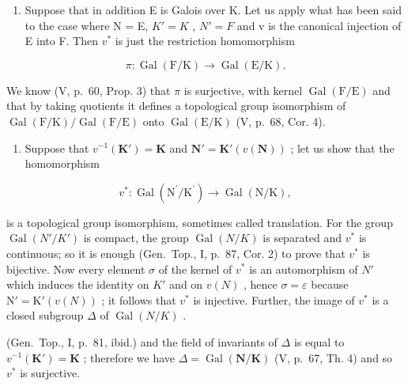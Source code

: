 \begin{enumerate}
\def\labelenumi{\alph{enumi})}
\setcounter{enumi}{1}
\tightlist
\item
  Suppose that in addition E is Galois over K. Let us apply what has been said to the case where N = E, \(K' = K\) , \(N' = F\) and v is the canonical injection of E into F. Then \(v^{*}\) is just the restriction homomorphism
\end{enumerate}

\[
\pi : \operatorname{Gal} (\mathrm{F} / \mathrm{K}) \rightarrow \operatorname{Gal} (\mathrm{E} / \mathrm{K}).
\]

We know (V, p.~60, Prop. 3) that \(\pi\) is surjective, with kernel \(\operatorname{Gal}(\mathrm{F} / \mathrm{E})\) and that by taking quotients it defines a topological group isomorphism of \(\operatorname{Gal}(\mathrm{F} / \mathrm{K}) / \operatorname{Gal}(\mathrm{F} / \mathrm{E})\) onto \(\operatorname{Gal}(\mathrm{E} / \mathrm{K})\) (V, p.~68, Cor. 4).

\begin{enumerate}
\def\labelenumi{\alph{enumi})}
\setcounter{enumi}{2}
\tightlist
\item
  Suppose that \(v^{-1}(\mathbf{K}') = \mathbf{K}\) and \(\mathbf{N}' = \mathbf{K}'(v(\mathbf{N}))\) ; let us show that the homomorphism
\end{enumerate}

\[
v ^ {*}: \operatorname{Gal} \left(\mathrm{N} ^ {\prime} / \mathrm{K} ^ {\prime}\right)\rightarrow \operatorname{Gal} (\mathrm{N} / \mathrm{K}),
\]

is a topological group isomorphism, sometimes called translation. For the group \(\operatorname{Gal}(N'/K')\) is compact, the group \(\operatorname{Gal}(N/K)\) is separated and \(v^{*}\) is continuous; so it is enough (Gen.~Top., I, p.~87, Cor. 2) to prove that \(v^{*}\) is bijective. Now every element \(\sigma\) of the kernel of \(v^{*}\) is an automorphism of \(N'\) which induces the identity on \(K'\) and on \(v(N)\) , hence \(\sigma = \varepsilon\) because \(\mathrm{N}' = \mathrm{K}'(v(N))\) ; it follows that \(v^{*}\) is injective. Further, the image of \(v^{*}\) is a closed subgroup \(\Delta\) of \(\operatorname{Gal}(N/K)\) .

(Gen.~Top., I, p.~81, ibid.) and the field of invariants of \(\Delta\) is equal to \(v^{-1}(\mathbf{K}') = \mathbf{K}\) ; therefore we have \(\Delta = \operatorname{Gal}(\mathbf{N}/\mathbf{K})\) (V, p.~67, Th. 4) and so \(v^{*}\) is surjective.

